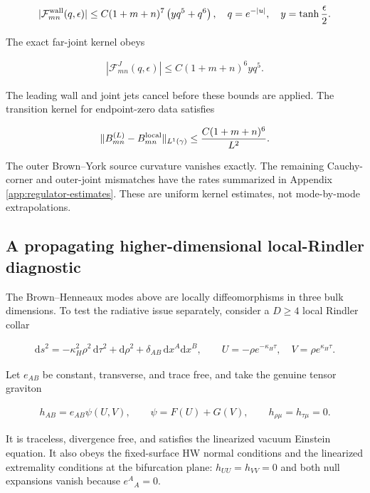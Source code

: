 \begin{align}
|\mathcal F_{mn}^{\rm wall}(q,\epsilon)|
\leq C(1+m+n)^7
\left(yq^5+q^6\right),
\quad
q=e^{-|u|},\quad y=\tanh\frac\epsilon2. \label{eq:wall-bound}
\end{align}

The exact far-joint kernel obeys

\begin{align}
|\mathcal F_{mn}^{J}(q,\epsilon)|
\leq C(1+m+n)^6yq^5. \label{eq:joint-bound}
\end{align}

The leading wall and joint jets cancel before these bounds are applied. The transition kernel for endpoint-zero data satisfies

\begin{align}
\|B_{mn}^{(L)}-B_{mn}^{\rm local}\|_{L^1(\gamma)}
\leq\frac{C(1+m+n)^6}{L^2}. \label{eq:transition-bound}
\end{align}

The outer Brown--York source curvature vanishes exactly. The remaining Cauchy-corner and outer-joint mismatches have the rates summarized in Appendix \ref{app:regulator-estimates}. These are uniform kernel estimates, not mode-by-mode extrapolations.

\subsection{A propagating higher-dimensional local-Rindler diagnostic}\label{subsec:higher-dimensional-diagnostic}

The Brown--Henneaux modes above are locally diffeomorphisms in three bulk dimensions. To test the radiative issue separately, consider a $D\geq4$ local Rindler collar

\begin{align}
\mathrm ds^2
=-\kappa_H^2\rho^2\,\mathrm d\tau^2+\mathrm d\rho^2
+\delta_{AB}\,\mathrm dx^A\mathrm dx^B,
\qquad
U=-\rho e^{-\kappa_H\tau},
\quad
V=\rho e^{\kappa_H\tau}.
\label{eq:local-rindler-metric}
\end{align}

Let $e_{AB}$ be constant, transverse, and trace free, and take the genuine tensor graviton

\begin{align}
h_{AB}=e_{AB}\psi(U,V),
\qquad
\psi=F(U)+G(V),
\qquad
h_{\rho\mu}=h_{\tau\mu}=0.
\label{eq:rindler-tt-mode}
\end{align}

It is traceless, divergence free, and satisfies the linearized vacuum Einstein equation. It also obeys the fixed-surface HW normal conditions and the linearized extremality conditions at the bifurcation plane: $h_{UU}=h_{VV}=0$ and both null expansions vanish because $e^A{}_A=0$.

